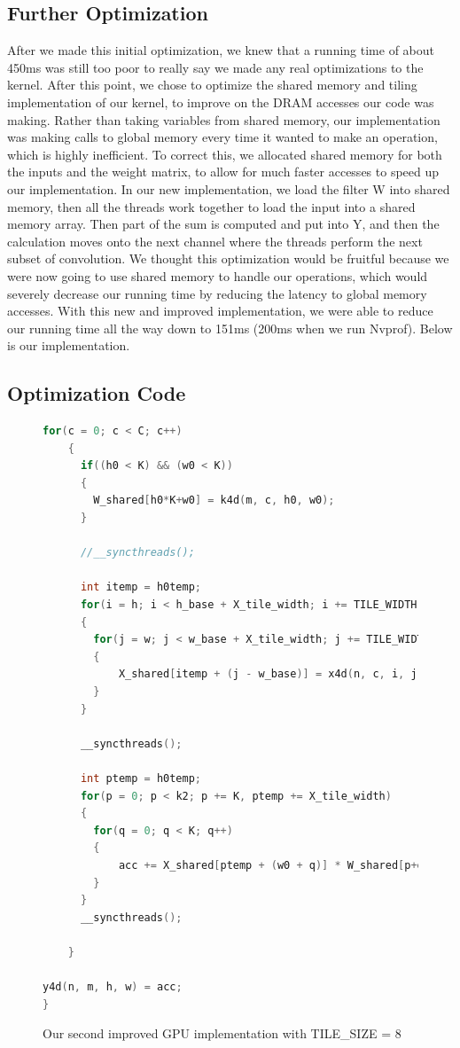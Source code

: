 \documentclass[titlepage]{article}
\begin{document}
\subsection*{Further Optimization}
After we made this initial optimization, we knew that a running time of about 450ms was still too poor to really say we made any real optimizations to the kernel. After this point, we chose to optimize the shared memory and tiling implementation of our kernel, to improve on the DRAM accesses our code was making. Rather than taking variables from shared memory, our implementation was making calls to global memory every time it wanted to make an operation, which is highly inefficient. To correct this, we allocated shared memory for both the inputs and the weight matrix, to allow for much faster accesses to speed up our implementation. In our new implementation, we load the filter W into shared memory, then all the threads work together to load the input into a shared memory array. Then part of the sum is computed and put into Y, and then the calculation moves onto the next channel where the threads perform the next subset of convolution. We thought this optimization would be fruitful because we were now going to use shared memory to handle our operations, which would severely decrease our running time by reducing the latency to global memory accesses. With this new and improved implementation, we were able to reduce our running time all the way down to 151ms (200ms when we run Nvprof). Below is our implementation.

\newpage

\subsection*{Optimization Code}
\begin{figure}[h!]
\begin{lstlisting}[language=C++]
for(c = 0; c < C; c++)
    {
      if((h0 < K) && (w0 < K))
      {
        W_shared[h0*K+w0] = k4d(m, c, h0, w0);
      }

      //__syncthreads();

      int itemp = h0temp;
      for(i = h; i < h_base + X_tile_width; i += TILE_WIDTH, itemp += x_tile_tile_width)
      {
        for(j = w; j < w_base + X_tile_width; j += TILE_WIDTH)
        {
            X_shared[itemp + (j - w_base)] = x4d(n, c, i, j);
        }
      }

      __syncthreads();

      int ptemp = h0temp;
      for(p = 0; p < k2; p += K, ptemp += X_tile_width)
      {
        for(q = 0; q < K; q++)
        {
            acc += X_shared[ptemp + (w0 + q)] * W_shared[p+q];
        }
      }
      __syncthreads();

    }

y4d(n, m, h, w) = acc;
}
\end{lstlisting}
\caption{Our second improved GPU implementation with TILE\_SIZE = 8}
\end{figure}
\end{document}
